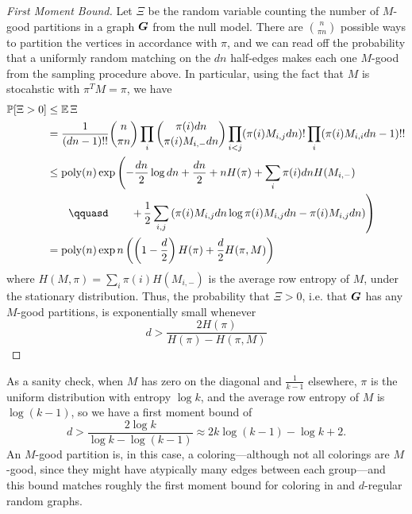 \begin{proof}[First Moment Bound]
    Let $\Xi$ be the random variable counting the number of $M$-good partitions in a graph $\boldsymbol{G}$ from the null model. There are ${n \choose \pi n}$ possible ways to partition the vertices in accordance with $\pi$, and we can read off the probability that a uniformly random matching on the $dn$ half-edges makes each one $M$-good from the sampling procedure above. In particular, using the fact that $M$ is stocahstic with $\pi^T M = \pi$, we have
    \begin{align*}
        \bbP[\Xi > 0] 
        &\le \expected\Xi \\
        &= \frac{1}{(dn-1)!!} {n\choose \pi n} \prod_i {\pi(i)dn \choose \pi(i)M_{i,-}dn} \prod_{i<j}(\pi(i)M_{i,j}dn)! \prod_i (\pi(i)M_{i,i}dn - 1)!! \\
        &\le\poly(n) \exp\left(-\frac{dn}{2}\log dn + \frac{dn}{2} + nH(\pi) + \sum_i \pi(i)dn H(M_{i,-}) \right. \\
        &\qquad\qquasd\qquad \left. +\, \frac{1}{2}\sum_{i,j}\left(\pi(i)M_{i,j}dn\log\pi(i)M_{i,j}dn - \pi(i)M_{i,j}dn\right)\right) \\
        &=\poly(n)\exp n\left(\left(1-\frac{d}{2}\right)H(\pi) + \frac{d}{2}H(\pi,M)\right)
    \end{align*} 
    where $H(M,\pi) = \sum_i \pi(i)H(M_{i,-})$ is the average row entropy of $M$, under the stationary distribution. Thus, the probability that $\Xi >0$, i.e. that $\boldsymbol{G}$ has any $M$-good partitions, is exponentially small whenever
    $$
       d > \frac{2H(\pi)}{H(\pi) - H(\pi,M)}
    $$
\end{proof}

\begin{remark}
    As a sanity check, when $M$ has zero on the diagonal and $\tfrac{1}{k-1}$ elsewhere, $\pi$ is the uniform distribution with entropy $\log k$, and the average row entropy of $M$ is $\log(k-1)$, so we have a first moment bound of
    $$
        d>\frac{2\log k}{\log k - \log(k-1)} \approx 2k\log (k-1)-\log k + 2.
    $$
    An $M$-good partition is, in this case, a coloring---although not all colorings are $M$-good, since they might have atypically many edges between each group---and this bound matches roughly the first moment bound for coloring in \ER and $d$-regular random graphs.
\end{remark}